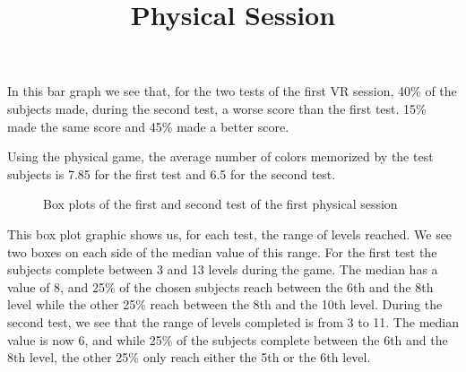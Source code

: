 \documentclass[12pt, openany, twocolumn]{article}
\begin{document}
            In this bar graph we see that, for the two tests of the first VR session, 40\% of the subjects made, during the second test, a worse score than the first test. 
            15\% made the same score and 45\% made a better score.
            \\

            \noindent \title{\textbf{Physical Session}} \vspace{0.25cm}

            Using the physical game, the average number of colors memorized by the test subjects is 7.85 for the first test and 6.5 for the second test.
          
                \begin{figure}[H]
                    \setlength{\fboxsep}{0pt}
                    \setlength{\fboxrule}{1pt}
                    \caption{Box plots of the first and second test of the first physical session}
                \end{figure}
        
            This box plot graphic shows us, for each test, the range of levels reached.
            We see two boxes on each side of the median value of this range.
            For the first test the subjects complete between 3 and 13 levels during the game. 
            The median has a value of 8, and 25\% of the chosen subjects reach between the 6th and the 8th level while the other 25\% reach between the 8th and the 10th level. 
            During the second test, we see that the range of levels completed is from 3 to 11. 
            The median value is now 6, and while 25\% of the subjects complete between the 6th and the 8th level, the other 25\% only reach either the 5th or the 6th level.
            \\
\end{document}
